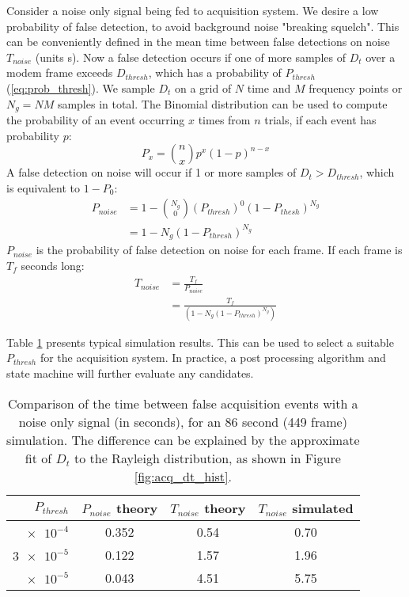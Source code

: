 \documentclass{article}
\begin{document}
Consider a noise only signal being fed to acquisition system.  We desire a low probability of false detection, to avoid background noise "breaking squelch".  This can be conveniently defined in the mean time between false detections on noise $T_{noise}$ (units s).  Now a false detection occurs if one of more samples of $D_t$ over a modem frame exceeds $D_{thresh}$, which has a probability of $P_{thresh}$ (\ref{eq:prob_thresh}).  We sample $D_t$ on a grid of $N$ time and $M$ frequency points or $N_g=NM$ samples in total. The Binomial distribution can be used to compute the probability of an event occurring $x$ times from $n$ trials, if each event has probability $p$:
\begin{equation}
P_x = {n \choose x} p^x (1-p)^{n-x}
\end{equation}
A false detection on noise will occur if 1 or more samples of $D_t>D_{thresh}$, which is equivalent to $1-P_0$:
\begin{equation}
\label{eq:Pnoise_theory}
\begin{split}
P_{noise} &= 1 - {N_g \choose 0} (P_{thresh})^0 (1-P_{thesh})^{N_g} \\
    &= 1 - N_g(1 - P_{thresh})^{N_g}
\end{split}
\end{equation}
$P_{noise}$ is the probability of false detection on noise for each frame.  If each frame is $T_f$ seconds long:
\begin{equation}
\label{eq:t_false_noise}
\begin{split}
T_{noise} &= \frac{T_f}{P_{noise}} \\
   &= \frac{T_f}{(1 - N_g(1-P_{thresh})^{N_g})}
\end{split}
\end{equation}

Table \ref{tab:noise_false_comparsion} presents typical simulation results.  This can be used to select a suitable $P_{thresh}$ for the acquisition system.  In practice, a post processing algorithm and state machine will further evaluate any candidates.

\begin{table}[h]
\centering
\begin{tabular}{r c c c}
 \hline
 $P_{thresh}$ & $P_{noise}$ theory & $T_{noise}$ theory & $T_{noise}$ simulated \\
 \hline
 $\num{e-4}$ & 0.352 & 0.54 & 0.70 \\
 $\num{3e-5}$ & 0.122 & 1.57 & 1.96 \\
 $\num{e-5}$ & 0.043 & 4.51 & 5.75 \\
 \hline
\end{tabular}
\caption{Comparison of the time between false acquisition events with a noise only signal (in seconds), for an 86 second (449 frame) simulation. The difference can be explained by the approximate fit of $D_t$ to the Rayleigh distribution, as shown in Figure \ref{fig:acq_dt_hist}.}
\label{tab:noise_false_comparsion}
\end{table}
\end{document}
